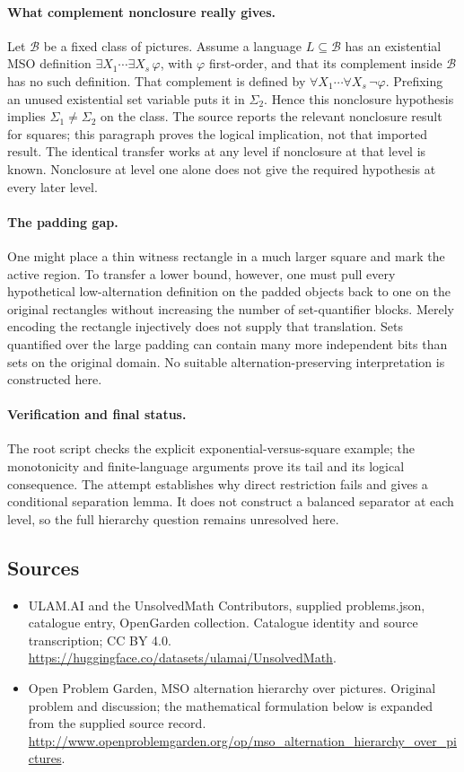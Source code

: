 \documentclass[11pt,a4paper]{article}
\begin{document}
\paragraph{What complement nonclosure really gives.}
Let $\mathcal B$ be a fixed class of pictures. Assume a
language $L\subseteq\mathcal B$ has an existential MSO
definition $\exists X_1\cdots\exists X_s\,\varphi$, with
$\varphi$ first-order, and that its complement inside
$\mathcal B$ has no such definition. That complement
is defined by $\forall X_1\cdots\forall X_s\,\neg\varphi$.
Prefixing an unused existential set variable puts it in
$\Sigma_2$. Hence this nonclosure hypothesis implies
$\Sigma_1\ne\Sigma_2$ on the class. The source reports
the relevant nonclosure result for squares; this paragraph
proves the logical implication, not that imported result.
The identical transfer works at any level if nonclosure
at that level is known. Nonclosure at level one alone
does not give the required hypothesis at every later level.

\paragraph{The padding gap.}
One might place a thin witness rectangle in a much larger
square and mark the active region. To transfer a lower
bound, however, one must pull every hypothetical
low-alternation definition on the padded objects back
to one on the original rectangles without increasing
the number of set-quantifier blocks. Merely encoding
the rectangle injectively does not supply that translation.
Sets quantified over the large padding can contain many
more independent bits than sets on the original domain.
No suitable alternation-preserving interpretation is
constructed here.

\paragraph{Verification and final status.}
The root script checks the explicit exponential-versus-square
example; the monotonicity and finite-language arguments
prove its tail and its logical consequence. The attempt
establishes why direct restriction fails and gives a
conditional separation lemma. It does not construct a
balanced separator at each level, so the full hierarchy
question remains unresolved here.

\subsection{Sources}
\begin{itemize}
\item[S1] ULAM.AI and the UnsolvedMath Contributors, supplied problems.json, catalogue entry, OpenGarden collection. Catalogue identity and source transcription; CC BY 4.0.
\url{https://huggingface.co/datasets/ulamai/UnsolvedMath}.
\item[S2] Open Problem Garden, MSO alternation hierarchy over pictures. Original problem and discussion; the mathematical formulation below is expanded from the supplied source record.
\url{http://www.openproblemgarden.org/op/mso_alternation_hierarchy_over_pictures}.

\end{itemize}
\end{document}
